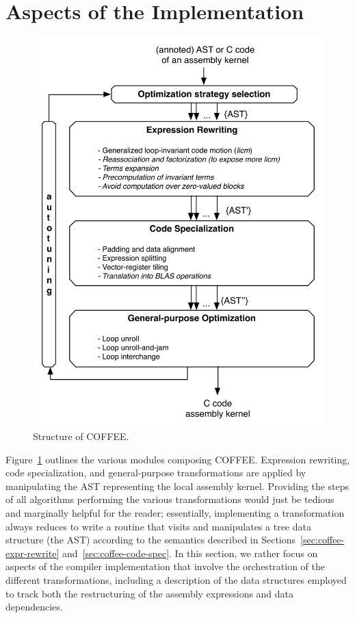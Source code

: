 \section{Aspects of the Implementation}

\begin{figure}
\begin{center}
\includegraphics[scale=0.70]{coffee/pictures/coffee-scheme.pdf}
\caption{Structure of COFFEE.}
\label{fig:coffee-compiler-structure}
\end{center}
\end{figure}

Figure~\ref{fig:coffee-compiler-structure} outlines the various modules composing COFFEE. Expression rewriting, code specialization, and general-purpose transformations are applied by manipulating the AST representing the local assembly kernel. Providing the steps of all algorithms performing the various transformations would just be tedious and marginally helpful for the reader; essentially, implementing a transformation always reduces to write a routine that visits and manipulates a tree data structure (the AST) according to the semantics described in Sections~\ref{sec:coffee-expr-rewrite} and~\ref{sec:coffee-code-spec}. In this section, we rather focus on aspects of the compiler implementation that involve the orchestration of the different transformations, including a description of the data structures employed to track both the restructuring of the assembly expressions and data dependencies. 

